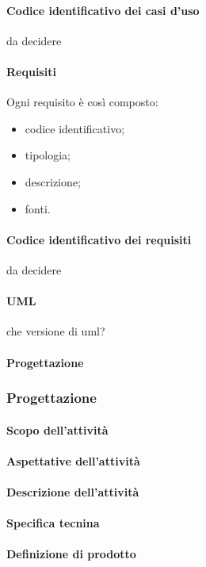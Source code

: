  \paragraph{Codice identificativo dei casi d'uso}
da decidere
 \paragraph{Requisiti}
 Ogni requisito è così composto:
  \begin{itemize}
  \item codice identificativo;
  \item tipologia;
  \item descrizione;
  \item fonti.
 \end{itemize}
 \paragraph{Codice identificativo dei requisiti}
 da decidere
 \paragraph{UML}
 che versione di uml?
 \paragraph{Progettazione}

\subsubsection{Progettazione}
 \paragraph{Scopo dell'attività}

 \paragraph{Aspettative dell'attività}

 \paragraph{Descrizione dell'attività}

 \paragraph{Specifica tecnina}

 \paragraph{Definizione di prodotto}

